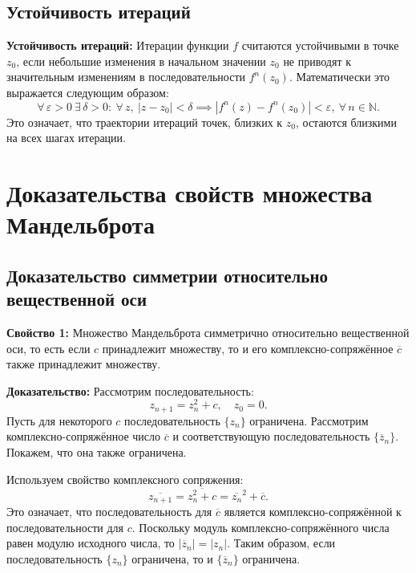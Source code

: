 \documentclass{article}
\begin{document}
	\subsection{Устойчивость итераций}
	\textbf{Устойчивость итераций:} Итерации функции $f$ считаются устойчивыми в точке $z_0$, если небольшие изменения в начальном значении $z_0$ не приводят к значительным изменениям в последовательности $f^n(z_0)$. Математически это выражается следующим образом:
	\begin{equation}
		\forall\, \varepsilon > 0\ \exists\, \delta > 0:\ \forall\, z,\ |z - z_0| < \delta \implies |f^n(z) - f^n(z_0)| < \varepsilon,\ \forall\, n \in \mathbb{N}.
	\end{equation}
	Это означает, что траектории итераций точек, близких к $z_0$, остаются близкими на всех шагах итерации.
	
	\newpage
	
	\section{Доказательства свойств множества Мандельброта}
	
	\subsection{Доказательство симметрии относительно вещественной оси}
	\textbf{Свойство 1:} Множество Мандельброта симметрично относительно вещественной оси, то есть если $c$ принадлежит множеству, то и его комплексно-сопряжённое $\overline{c}$ также принадлежит множеству.
	
	\textbf{Доказательство:}
	Рассмотрим последовательность:
	\begin{equation}
		z_{n+1} = z_n^2 + c, \quad z_0 = 0.
	\end{equation}
	Пусть для некоторого $c$ последовательность $\{z_n\}$ ограничена. Рассмотрим комплексно-сопряжённое число $\overline{c}$ и соответствующую последовательность $\{\overline{z}_n\}$. Покажем, что она также ограничена.
	
	Используем свойство комплексного сопряжения:
	\begin{equation}
		\overline{z_{n+1}} = \overline{z_n^2 + c} = \overline{z_n}^2 + \overline{c}.
	\end{equation}
	Это означает, что последовательность для $\overline{c}$ является комплексно-сопряжённой к последовательности для $c$. Поскольку модуль комплексно-сопряжённого числа равен модулю исходного числа, то $|\overline{z}_n| = |z_n|$. Таким образом, если последовательность $\{z_n\}$ ограничена, то и $\{\overline{z}_n\}$ ограничена.
	
\end{document}
